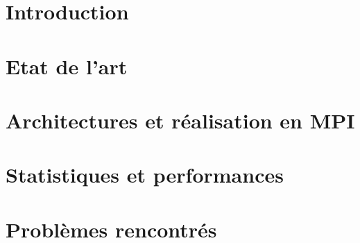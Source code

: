 \documentclass[14pt,a4paper,titlepage]{report}
\begin{document}

\renewcommand\headrulewidth{2pt}

\newpage
\pagestyle{empty}
\tableofcontents

\newpage
\chapter{Introduction}
\thispagestyle{fancy}



\chapter{Etat de l'art}
\thispagestyle{fancy}



\chapter{Architectures et réalisation en MPI}
\thispagestyle{fancy}




\chapter{Statistiques et performances}
\thispagestyle{fancy}



\chapter{Problèmes rencontrés }
\thispagestyle{fancy}


\end{document}
